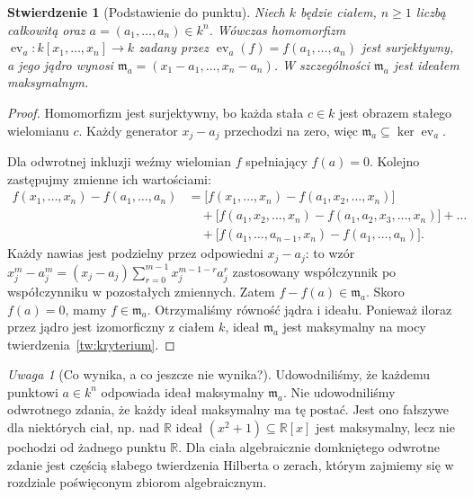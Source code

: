 \documentclass[11pt,a4paper,openany]{report}
\numberwithin{equation}{section}
\theoremstyle{plain}
\newtheorem{stwierdzenie}[twierdzenie]{Stwierdzenie}
\theoremstyle{definition}
\theoremstyle{remark}
\newtheorem{uwaga}[twierdzenie]{Uwaga}
\newcommand{\R}{\mathbb R}
\newcommand{\kerf}{\operatorname{ker}}
\newcommand{\ev}{\operatorname{ev}}
\begin{document}
\begin{stwierdzenie}[Podstawienie do punktu]
\label{st:eval-point}
Niech $k$ będzie ciałem, $n\ge1$ liczbą całkowitą
oraz $a=(a_1,\dots,a_n)\in k^n$. Wówczas homomorfizm
$\ev_a\colon k[x_1,\dots,x_n]\to k$ zadany przez
$\ev_a(f)=f(a_1,\dots,a_n)$ jest surjektywny, a jego jądro wynosi
$\mathfrak m_a=(x_1-a_1,\dots,x_n-a_n)$.
W szczególności $\mathfrak m_a$ jest ideałem maksymalnym.
\end{stwierdzenie}
\begin{proof}
Homomorfizm jest surjektywny, bo każda stała $c\in k$
jest obrazem stałego wielomianu $c$. Każdy generator $x_j-a_j$
przechodzi na zero, więc
$\mathfrak m_a\subseteq\kerf\ev_a$.

Dla odwrotnej inkluzji weźmy wielomian $f$ spełniający $f(a)=0$.
Kolejno zastępujmy zmienne ich wartościami:
\begin{align*}
 f(x_1,\dots,x_n)-f(a_1,\dots,a_n)
 &=\bigl[f(x_1,\dots,x_n)-f(a_1,x_2,\dots,x_n)\bigr]\\
 &\quad+\bigl[f(a_1,x_2,\dots,x_n)-f(a_1,a_2,x_3,\dots,x_n)\bigr]
 +\dots\\
 &\quad+\bigl[f(a_1,\dots,a_{n-1},x_n)-f(a_1,\dots,a_n)\bigr].
\end{align*}
Każdy nawias jest podzielny przez odpowiedni $x_j-a_j$:
to wzór $x_j^m-a_j^m=(x_j-a_j)\sum_{r=0}^{m-1}x_j^{m-1-r}a_j^r$
zastosowany współczynnik po współczynniku w pozostałych zmiennych.
Zatem $f-f(a)\in\mathfrak m_a$. Skoro $f(a)=0$,
mamy $f\in\mathfrak m_a$. Otrzymaliśmy równość jądra i ideału.
Ponieważ iloraz przez jądro jest izomorficzny z ciałem $k$,
ideał $\mathfrak m_a$ jest maksymalny na mocy
 twierdzenia~\ref{tw:kryterium}.
\end{proof}

\begin{uwaga}[Co wynika, a co jeszcze nie wynika?]
Udowodniliśmy, że każdemu punktowi $a\in k^n$ odpowiada ideał
maksymalny $\mathfrak m_a$. Nie udowodniliśmy odwrotnego zdania,
że każdy ideał maksymalny ma tę postać. Jest ono fałszywe dla
niektórych ciał, np. nad $\R$ ideał $(x^2+1)\subseteq\R[x]$
jest maksymalny, lecz nie pochodzi od żadnego punktu $\R$.
Dla ciała algebraicznie domkniętego odwrotne zdanie jest częścią
słabego twierdzenia Hilberta o zerach, którym zajmiemy się
w rozdziale poświęconym zbiorom algebraicznym.
\end{uwaga}
\end{document}

